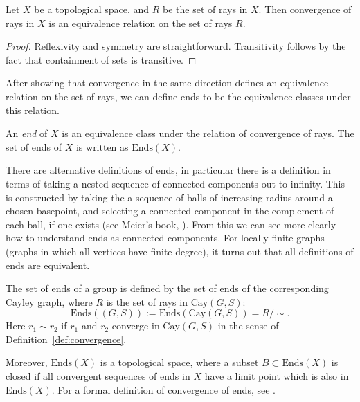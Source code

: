 \begin{proposition}
    Let \(X\) be a topological space, and \(R\) be the set of rays in \(X\). Then convergence of rays in \(X\) is an equivalence relation on the set of rays \(R\).
\end{proposition}

\begin{proof}
    Reflexivity and symmetry are straightforward. Transitivity follows by the fact that containment of sets is transitive.
\end{proof}

After showing that convergence in the same direction defines an equivalence relation on the set of rays, we can define ends to be the equivalence classes under this relation.
\begin{definition}
\label{def:endsofgraph}
    An \emph{end} of \(X\) is an equivalence class under the relation of convergence of rays. The set of ends of \(X\) is written as \(\mathrm{Ends}(X)\).
\end{definition}

\begin{remark}
\label{rem:diffdefsofends}
    There are alternative definitions of ends, in particular there is a definition in terms of taking a nested sequence of connected components out to infinity. This is constructed by taking the a sequence of balls of increasing radius around a chosen basepoint, and selecting a connected component in the complement of each ball, if one exists (see Meier's book, \cite[p.~208]{M08}). From this we can see more clearly how to understand ends as connected components. For locally finite graphs (graphs in which all vertices have finite degree), it turns out that all definitions of ends are equivalent.
\end{remark}

\begin{definition}
     The set of ends of a group is defined by the set of ends of the corresponding Cayley graph, where \(R\) is the set of rays in \(\mathrm{Cay}(G,S)\):
    \[
        \mathrm{Ends}((G,S)) := \mathrm{Ends}(\mathrm{Cay}(G,S)) = R/\sim.
    \]
    Here \(r_1 \sim r_2\) if \(r_1\) and \(r_2\) converge in \(\mathrm{Cay}(G,S)\) in the sense of Definition~\ref{def:convergence}.
\end{definition}

\begin{remark}
    Moreover, \(\mathrm{Ends}(X)\) is a topological space, where a subset \(B \subset \mathrm{Ends}(X)\) is closed if all convergent sequences of ends in \(X\) have a limit point which is also in \(\mathrm{Ends}(X)\). For a formal definition of convergence of ends, see \cite[p.~144]{bridson_haefliger_metric_1999}.
\end{remark}

